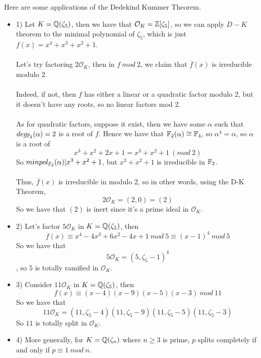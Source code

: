 \begin{example}
Here are some applications of the Dedekind Kummer Theorem.
\begin{itemize}
    \item 1) Let $K = \mathbb{Q}(\zeta_5)$, then we have that $\mathcal{O}_K = \mathbb{Z}[\zeta_5]$, so we can apply $D-K$ theorem to the minimal polynomial of $\zeta_5$, which is just $f(x) = x^4 + x^3 + x^2 + 1$.\\\\
    Let's try factoring $2 \mathcal{O}_K$, then in $f\ mod\ 2$, we claim that $\overline{f}(x)$ is irreducible modulo $2$.\\\\
    Indeed, if not, then $f$ has either a linear or a quadratic factor modulo $2$, but it doesn't have any roots, so no linear factors mod 2.\\\\
    As for quadratic factors, suppose it exist, then we have some $\alpha$ such that $deg_{\mathbb{F}_2}(\alpha) = 2$ is a root of $f$. Hence we have that $\mathbb{F}_2(\alpha) \cong \mathbb{F}_4$, so $\alpha^4 = \alpha$, so $\alpha$ is a root of
    \[x^3 + x^2 + 2x + 1 = x^3 + x^2 + 1\ (mod\ 2)\]
    So $minpol_{\mathbb{F}_2}(\alpha) | x^3 + x^2 + 1$, but $x^3 + x^2 + 1$ is irreducible in $\mathbb{F}_2$.\\\\
    Thus, $\overline{f}(x)$ is irreducible in modulo $2$, so in other words, using the D-K Theorem,
    \[2\mathcal{O}_K = (2, 0) = (2)\]
    So we have that $(2)$ is inert since it's a prime ideal in $\mathcal{O}_K$.
    \item 2) Let's factor $5 \mathcal{O}_K$ in $K = \mathbb{Q}(\zeta_5)$, then
    \[f(x) \equiv x^4 - 4x^3 + 6x^2 - 4x + 1\ mod\ 5 \equiv (x - 1)^4\ mod\ 5\]
    So we have that
    \[5\mathcal{O}_K = (5, \zeta_5 - 1)^4\]
    , so $5$ is totally ramified in $\mathcal{O}_K$.
    \item 3) Consider $11 \mathcal{O}_K$ in $K = \mathbb{Q}(\zeta_5)$, then
    \[f(x) \equiv (x -4)(x-9)(x-5)(x-3)\ mod\ 11\]
    So we have that
    \[11\mathcal{O}_K = (11, \zeta_5 - 4)(11, \zeta_5 - 9)(11, \zeta_5 - 5)(11, \zeta_5 - 3)\]
    So $11$ is totally split in $\mathcal{O}_K$.
    \item 4) More generally, for $K = \mathbb{Q}(\zeta_n)$ where $n \geq 3$ is prime, $p$ splits completely if and only if $p \equiv 1\ mod\ n$.
\end{itemize}
\end{example}


